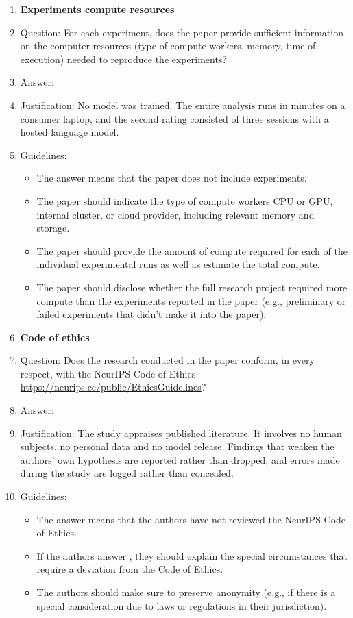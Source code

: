 \documentclass{article}
\begin{document}
\begin{enumerate}
\item {\bf Experiments compute resources}
    \item[] Question: For each experiment, does the paper provide sufficient information on the computer resources (type of compute workers, memory, time of execution) needed to reproduce the experiments?
    \item[] Answer: \answerYes{}
    \item[] Justification: No model was trained. The entire analysis runs in minutes on a consumer laptop, and the second rating consisted of three sessions with a hosted language model.
    \item[] Guidelines:
    \begin{itemize}
        \item The answer \answerNA{} means that the paper does not include experiments.
        \item The paper should indicate the type of compute workers CPU or GPU, internal cluster, or cloud provider, including relevant memory and storage.
        \item The paper should provide the amount of compute required for each of the individual experimental runs as well as estimate the total compute. 
        \item The paper should disclose whether the full research project required more compute than the experiments reported in the paper (e.g., preliminary or failed experiments that didn't make it into the paper). 
    \end{itemize}
    
\item {\bf Code of ethics}
    \item[] Question: Does the research conducted in the paper conform, in every respect, with the NeurIPS Code of Ethics \url{https://neurips.cc/public/EthicsGuidelines}?
    \item[] Answer: \answerYes{}
    \item[] Justification: The study appraises published literature. It involves no human subjects, no personal data and no model release. Findings that weaken the authors' own hypothesis are reported rather than dropped, and errors made during the study are logged rather than concealed.
    \item[] Guidelines:
    \begin{itemize}
        \item The answer \answerNA{} means that the authors have not reviewed the NeurIPS Code of Ethics.
        \item If the authors answer \answerNo, they should explain the special circumstances that require a deviation from the Code of Ethics.
        \item The authors should make sure to preserve anonymity (e.g., if there is a special consideration due to laws or regulations in their jurisdiction).
    \end{itemize}



\end{enumerate}
\end{document}
